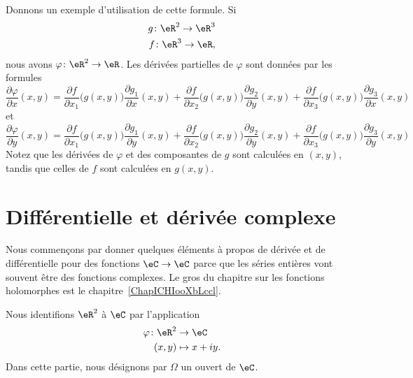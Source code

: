 Donnons un exemple d'utilisation de cette formule. Si
\begin{equation}
	\begin{aligned}[]
		g\colon \eR^2\to \eR^3\\
		f\colon \eR^3\to \eR,
	\end{aligned}
\end{equation}
nous avons $\varphi\colon \eR^2\to \eR$. Les dérivées partielles de $\varphi$ sont données par les formules
\begin{equation}
	\frac{ \partial \varphi }{ \partial x }(x,y)=\frac{ \partial f }{ \partial x_1 }\big( g(x,y) \big)\frac{ \partial g_1 }{ \partial x }(x,y)+\frac{ \partial f }{ \partial x_2 }\big( g(x,y) \big)\frac{ \partial g_2 }{ \partial y }(x,y)+\frac{ \partial f }{ \partial x_3 }\big( g(x,y) \big)\frac{ \partial g_3 }{ \partial x }(x,y)
\end{equation}
et
\begin{equation}
	\frac{ \partial \varphi }{ \partial y }(x,y)=\frac{ \partial f }{ \partial x_1 }\big( g(x,y) \big)\frac{ \partial g_1 }{ \partial y }(x,y)+\frac{ \partial f }{ \partial x_2 }\big( g(x,y) \big)\frac{ \partial g_2 }{ \partial y }(x,y)+\frac{ \partial f }{ \partial x_3 }\big( g(x,y) \big)\frac{ \partial g_3 }{ \partial y }(x,y)
\end{equation}
Notez que les dérivées de $\varphi$ et des composantes de $g$ sont calculées en $(x,y)$, tandis que celles de $f$ sont calculées en $g(x,y)$.

\section{Différentielle et dérivée complexe}
\label{SECooJWNOooOgMiWR}

\begin{normaltext}
    Nous commençons par donner quelques éléments à propos de dérivée et de différentielle pour des fonctions \( \eC\to \eC\) parce que les séries entières vont souvent être des fonctions complexes. Le gros du chapitre sur les fonctions holomorphes est le chapitre~\ref{ChapICHIooXbLccl}.
\end{normaltext}

Nous identifions \( \eR^2\) à \( \eC\) par l'application
\begin{equation}
    \begin{aligned}
        \varphi\colon \eR^2&\to \eC \\
        (x,y)&\mapsto x+iy.
    \end{aligned}
\end{equation}
Dans cette partie, nous désignons par \( \Omega\) un ouvert de \( \eC\).

